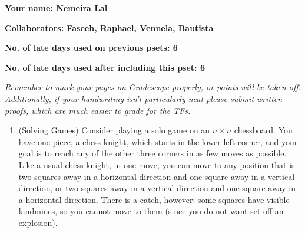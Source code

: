 \documentclass[11pt]{article}
\begin{document}

\textbf{Your name: Nemeira Lal}

\textbf{Collaborators: Faseeh, Raphael, Vennela, Bautista}

\textbf{No. of late days used on previous psets: 6}

\textbf{No. of late days used after including this pset: 6}

\medskip \noindent
\textit{Remember to mark your pages on Gradescope properly, or points will be taken off. Additionally, if your handwriting isn't particularly neat please submit written proofs, which are much easier to grade for the TFs.}

\begin{enumerate}
    \item (Solving Games) Consider playing a solo game on an $n\times n$ chessboard.  You have one piece, a chess knight, which starts in the lower-left corner, and your goal is to reach any of the other three corners in as few moves as possible.  Like a usual chess knight, in one move, you can move to any position that is two squares away in a horizontal direction and one square away in a vertical direction, or two squares away in a vertical direction and one square away in a horizontal direction.  There is a catch, however: some squares have visible landmines, so you cannot move to them (since you do not want set off an explosion). \


\end{enumerate}
\end{document}
